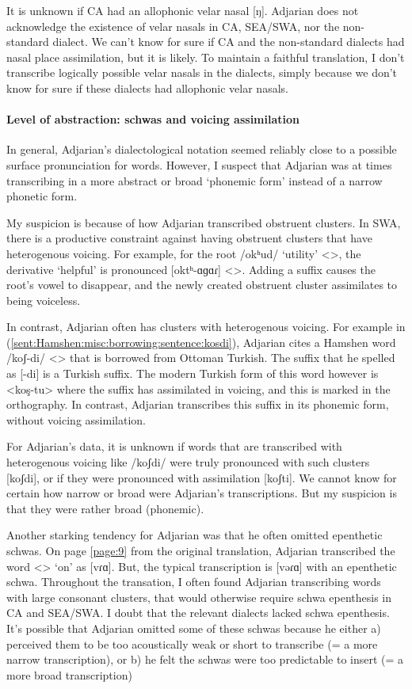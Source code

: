 It is unknown if CA had an allophonic velar nasal [ŋ]. Adjarian does not acknowledge the existence of velar nasals in CA, SEA/SWA, nor the non-standard dialect. We can't know for sure if CA and the non-standard dialects had nasal place assimilation, but it is likely. To maintain a faithful translation, I don't transcribe logically possible velar nasals in the dialects, simply because we don't know for sure if these dialects had allophonic velar nasals. 

\paragraph{Level of abstraction: schwas and   voicing assimilation}

In general, Adjarian's dialectological notation seemed reliably close to a possible surface pronunciation for words. However, I suspect that Adjarian was at times transcribing in a more abstract or broad `phonemic form' instead of a narrow phonetic form. 

My suspicion is because of how Adjarian transcribed obstruent clusters. In SWA, there is a productive constraint against having obstruent clusters that have heterogenous voicing. For example, for the root /okʰud/ `utility' <>, the derivative `helpful' is pronounced [oktʰ-ɑɡɑɾ] <>. Adding a suffix causes the root's vowel to disappear, and the newly created obstruent cluster assimilates to being voiceless. 

In contrast, Adjarian often has clusters with heterogenous voicing. For example in (\ref{sent:Hamshen:misc:borrowing:sentence:kosdi}), Adjarian cites a Hamshen word /koʃ-di/ <> that is borrowed from Ottoman Turkish. The suffix that he spelled as [-di] is a Turkish suffix.  The modern Turkish form of this word however is <koş-tu> where the suffix has assimilated in voicing, and this is marked in the orthography. In contrast, Adjarian transcribes this suffix in its phonemic form, without voicing assimilation.

For Adjarian's data, it is unknown if words that are transcribed with heterogenous voicing like /koʃdi/ were truly pronounced with such clusters [koʃdi], or if they were pronounced with assimilation [koʃti]. We cannot know for certain how narrow or broad were Adjarian's   transcriptions. But my suspicion is that they were rather broad (phonemic). 

Another starking tendency for Adjarian was that he often omitted epenthetic schwas. On page \ref{page:9} from the original translation, Adjarian transcribed the word <> `on' as [vɾɑ]. But, the typical transcription is [vəɾɑ] with an epenthetic schwa. Throughout the transation, I often found Adjarian transcribing words with large consonant clusters, that would otherwise require schwa epenthesis in CA and SEA/SWA. I doubt that the relevant dialects lacked schwa epenthesis. It's possible that  Adjarian omitted some of these schwas because he either a) perceived them to be too acoustically weak or short to transcribe (= a more narrow transcription), or b) he felt the schwas were too predictable to insert (= a more broad transcription) 




